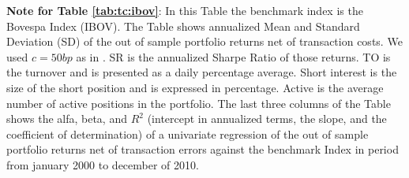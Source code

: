 \documentclass[preprint, doubleblind, authoryear,10pt]{elsarticle}
\begin{document}
\begin{singlespace}
{\footnotesize
\textbf{Note for Table \ref{tab:tc:ibov}}:
In this Table the benchmark index is the Bovespa Index (IBOV).
The Table shows annualized Mean and Standard Deviation (SD) of the out of sample portfolio returns net of transaction costs.
We used $c=50bp$ as in \cite{dgu2009}.
SR is the annualized Sharpe Ratio of those returns.
TO is the turnover and is presented as a daily percentage average.
Short interest is the size of the short position and is expressed in percentage.
Active is the average number of active positions in the portfolio.
The last three columns of the Table shows the alfa, beta, and $R^2$ (intercept in annualized terms, the slope, and the coefficient of determination) of a univariate regression of the out of sample portfolio returns net of transaction errors against the benchmark Index in period from january 2000 to december of 2010.}
\end{singlespace}

\clearpage
\end{document}
